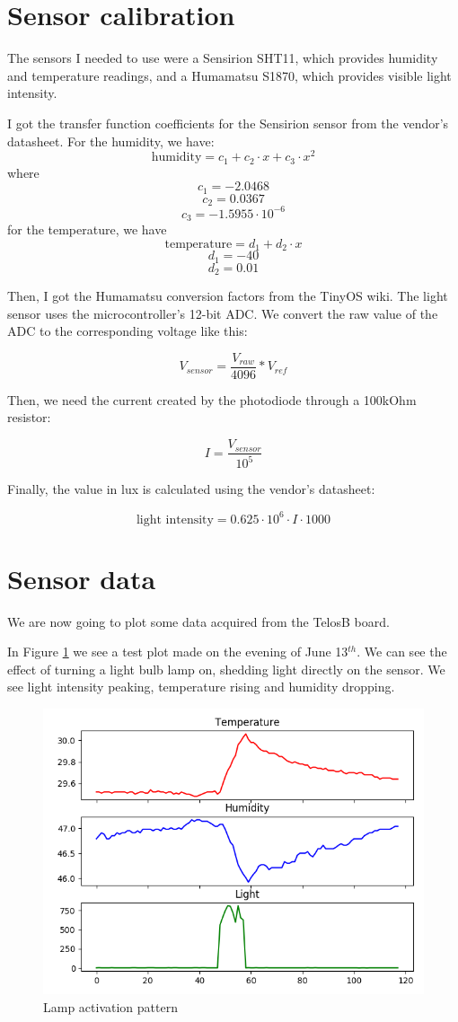 \documentclass[11pt]{article}
\begin{document}
\section{Sensor calibration}
The sensors I needed to use were a Sensirion SHT11, which provides humidity and temperature readings, and a Humamatsu S1870, which provides visible light intensity. 

I got the transfer function coefficients for the Sensirion sensor from the vendor's datasheet. For the humidity, we have:
$$\text{humidity}=c_1+c_2\cdot x +c_3\cdot x^2$$
where
$$c_1= -2.0468$$
$$c_2=  0.0367$$
$$c_3= -1.5955\cdot10^{-6}$$
for the temperature, we have
$$\text{temperature}=d_1+d_2\cdot x$$ 
$$d_1= -40$$
$$d_2=  0.01$$

Then, I got the Humamatsu conversion factors from the TinyOS wiki. The light sensor uses the microcontroller's 12-bit ADC. We convert the raw value of the ADC to the corresponding voltage like this:

$$ V_{sensor}=\frac{V_{raw}}{4096} * V_{ref} $$ 

Then, we need the current created by the photodiode through a 100kOhm resistor:

$$I = \frac{ V_{sensor} }{10^5}$$

Finally, the value in lux is calculated using the vendor's datasheet: 

$$\text{light intensity} = 0.625\cdot10^6 \cdot I \cdot 1000$$
  

\section{Sensor data}

We are now going to plot some data acquired from the TelosB board.

In Figure \ref{fig:lamp} we see a test plot made on the evening of June 13$^{th}$. We can see the effect of turning a light bulb lamp on, shedding light directly on the sensor. We see light intensity peaking, temperature rising and humidity dropping.


\begin{figure}[h]
\includegraphics[width=\textwidth]{lamp}
\caption{Lamp activation pattern}
\label{fig:lamp}
\end{figure}
\end{document}
